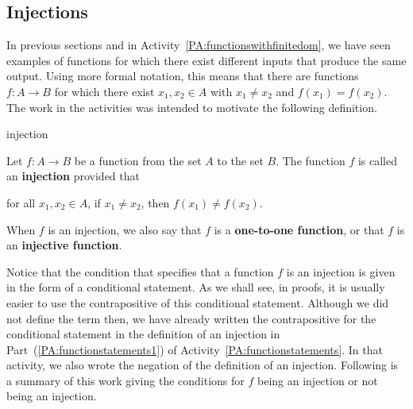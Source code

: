 \subsection*{Injections}
In previous sections and in \typeu Activity~\ref*{PA:functionswithfinitedom}, we have seen examples of functions for which there exist different inputs that produce the same output.   Using more formal notation, this means that there are functions  $f:A \to B$ for which there exist  \mbox{$x_1 , x_2  \in A$}
 with  $x_1  \ne x_2 $  and  $f( {x_1 } ) = f( {x_2 } )$.    
The work in the \typel activities was intended to motivate the following definition.
%
\begin{defbox}{injection}{Let  $f:A \to B$  be a function from the set  $A$  to the set  $B$.  The function  $f$  is called an \textbf{injection}
%
 provided that
\begin{center}
for all  $x_1 , x_2  \in A$, if  $x_1  \ne x_2 $, then  
$f( {x_1 } ) \ne f( {x_2 } )$.
\end{center}
When  $f$  is an injection, we also say that  $f$  is a \textbf{one-to-one function},
%
%
 or that  $f$  is an \textbf{injective function}.}
%

\end{defbox}
%
Notice that the condition that specifies that a function  $f$  is an injection is given in the form of a conditional statement.  As we shall see, in proofs, it is usually easier to use the contrapositive of this conditional statement.  Although we did not define the term then, we have already written the contrapositive for the conditional statement in the definition of an injection in Part~(\ref{PA:functionstatements1}) of \typeu Activity~\ref*{PA:functionstatements}.  In that activity, we also wrote the negation of the definition of an injection.  Following is a summary of this work giving the conditions for  $f$  being an injection or not being an injection.

